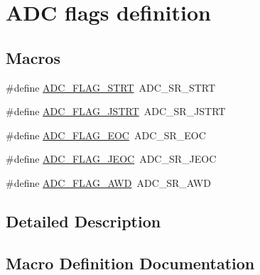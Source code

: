 \hypertarget{group___a_d_c__flags__definition}{}\section{A\+DC flags definition}
\label{group___a_d_c__flags__definition}
\subsection*{Macros}
\begin{DoxyCompactItemize}
\item 
\#define \hyperlink{group___a_d_c__flags__definition_gad0c59ae7749c69b5b91f2c533db1b619}{A\+D\+C\+\_\+\+F\+L\+A\+G\+\_\+\+S\+T\+RT}~A\+D\+C\+\_\+\+S\+R\+\_\+\+S\+T\+RT
\item 
\#define \hyperlink{group___a_d_c__flags__definition_ga278f4e866f4322c1120bf0db5301c432}{A\+D\+C\+\_\+\+F\+L\+A\+G\+\_\+\+J\+S\+T\+RT}~A\+D\+C\+\_\+\+S\+R\+\_\+\+J\+S\+T\+RT
\item 
\#define \hyperlink{group___a_d_c__flags__definition_gaf2c6fdf7e9ab63b778149e5fb56413d4}{A\+D\+C\+\_\+\+F\+L\+A\+G\+\_\+\+E\+OC}~A\+D\+C\+\_\+\+S\+R\+\_\+\+E\+OC
\item 
\#define \hyperlink{group___a_d_c__flags__definition_ga4df8eea8ab83d98104ee15a339743a4e}{A\+D\+C\+\_\+\+F\+L\+A\+G\+\_\+\+J\+E\+OC}~A\+D\+C\+\_\+\+S\+R\+\_\+\+J\+E\+OC
\item 
\#define \hyperlink{group___a_d_c__flags__definition_gadb75a4b430fb84950232b7a8f3a6a877}{A\+D\+C\+\_\+\+F\+L\+A\+G\+\_\+\+A\+WD}~A\+D\+C\+\_\+\+S\+R\+\_\+\+A\+WD
\end{DoxyCompactItemize}


\subsection{Detailed Description}


\subsection{Macro Definition Documentation}
\mbox{\label{group___a_d_c__flags__definition_gadb75a4b430fb84950232b7a8f3a6a877}} 
